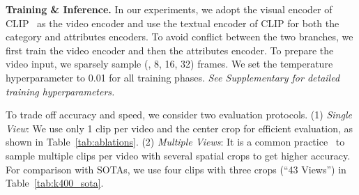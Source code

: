 \documentclass[10pt,twocolumn,letterpaper]{article}
\def\x{}
\begin{document}
\textbf{Training \& Inference.}\label{training}
In our experiments, we adopt the visual encoder of CLIP~\cite{CLIP} as the video encoder and use the textual encoder of CLIP for both the category and attributes encoders. To avoid conflict between the two branches, we first train the video encoder and then the attributes encoder.
To prepare the video input, we sparsely sample  (\eg, 8, 16, 32) frames. We set the temperature hyperparameter  to 0.01 for all training phases.
\emph{See Supplementary for detailed training hyperparameters.} 


To trade off accuracy and speed, we consider two evaluation protocols. 
(1) \emph{Single View}: We use only 1 clip per video and the center crop for efficient evaluation, as shown in Table~\ref{tab:ablations}.
(2) \emph{Multiple Views}: It is a common practice~\cite{slowfast,i3d,wu2020MVFNet} to sample multiple clips per video with several spatial crops to get higher accuracy. For comparison with SOTAs, we use four clips with three crops (``4\x3 Views'') in Table~\ref{tab:k400_sota}.
\end{document}
